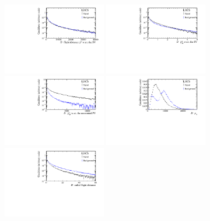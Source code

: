 \begin{figure}[tbp]
	\begin{center}
		\includegraphics[width=0.40\textwidth]{07selection/figs/BDTInputs/ab2_FDCHI2_ORIVX.pdf}
		\includegraphics[width=0.40\textwidth]{07selection/figs/BDTInputs/ab2_IPCHI2_ORIVX.pdf}\\
		\includegraphics[width=0.40\textwidth]{07selection/figs/BDTInputs/ab2_IPCHI2_OWNPV.pdf}
		\includegraphics[width=0.40\textwidth]{07selection/figs/BDTInputs/ab2_PT.pdf}\\
		\includegraphics[width=0.40\textwidth]{07selection/figs/BDTInputs/ab2_RadialFD_squared.pdf}

\end{center}
\end{figure}
